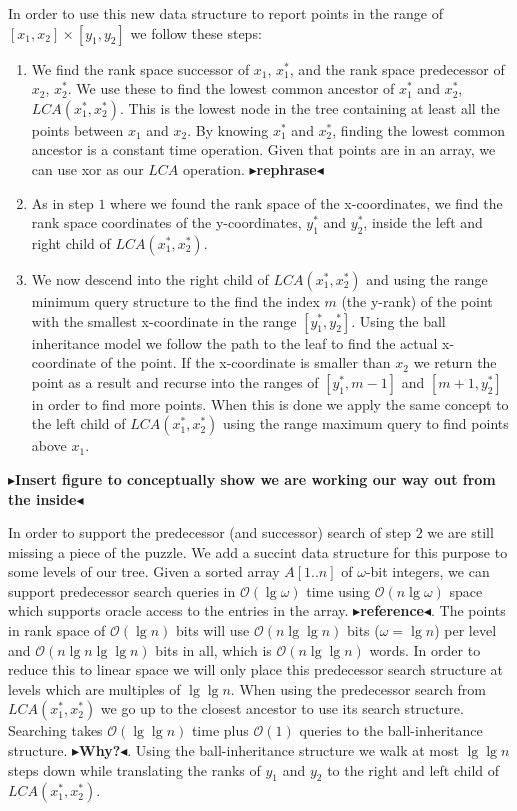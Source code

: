 \documentclass[twoside,11pt,openright]{report}
\newcommand{\todo}[1]{{\color[rgb]{.5,0,0}\textbf{$\blacktriangleright$#1$\blacktriangleleft$}}}
\begin{document}
In order to use this new data structure to report points in the range of $[x_1, x_2] \times [y_1, y_2]$ we follow these steps:
\begin{enumerate}
  \item We find the rank space successor of $x_1$, $x^*_1$, and the rank space predecessor of $x_2$, $x^*_2$. We use these to find the lowest common ancestor of $x^*_1$ and $x^*_2$, $LCA(x^*_1, x^*_2)$. This is the lowest node in the tree containing at least all the points between $x_1$ and $x_2$. By knowing $x^*_1$ and $x^*_2$, finding the lowest common ancestor is a constant time operation. Given that points are in an array, we can use xor as our $LCA$ operation. \todo{rephrase}
  \item As in step $1$ where we found the rank space of the x-coordinates, we find the rank space coordinates of the y-coordinates, $y^*_1$ and $y^*_2$, inside the left and right child of $LCA(x^*_1, x^*_2)$.
  \item We now descend into the right child of $LCA(x^*_1, x^*_2)$ and using the range minimum query structure to the find the index $m$ (the y-rank) of the point with the smallest x-coordinate in the range $[y^*_1, y^*_2]$. Using the ball inheritance model we follow the path to the leaf to find the actual x-coordinate of the point. If the x-coordinate is smaller than $x_2$ we return the point as a result and recurse into the ranges of $[y^*_1, m-1]$ and $[m+1, y^*_2]$ in order to find more points. When this is done we apply the same concept to the left child of $LCA(x^*_1, x^*_2)$ using the range maximum query to find points above $x_1$.
\end{enumerate}

\todo{Insert figure to conceptually show we are working our way out from the inside}

In order to support the predecessor (and successor) search of step $2$ we are still missing a piece of the puzzle. We add a succint data structure for this purpose to some levels of our tree. Given a sorted array $A[1..n]$ of $\omega$-bit integers, we can support predecessor search queries in $\mathcal{O}(\lg \omega)$ time using $\mathcal{O}(n \lg \omega)$ space which supports oracle access to the entries in the array. \todo{reference}. The points in rank space of $\mathcal{O}(\lg n)$ bits will use $\mathcal{O}(n \lg \lg n)$ bits ($\omega = \lg n$) per level and $\mathcal{O}(n \lg n \lg \lg n)$ bits in all, which is $\mathcal{O}(n \lg \lg n)$ words. In order to reduce this to linear space we will only place this predecessor search structure at levels which are multiples of $\lg \lg n$. When using the predecessor search from $LCA(x^*_1, x^*_2)$ we go up to the closest ancestor to use its search structure. Searching takes $\mathcal{O}(\lg \lg n)$ time plus $\mathcal{O}(1)$ queries to the ball-inheritance structure. \todo{Why?}. Using the ball-inheritance structure we walk at most $\lg \lg n$ steps down while translating the ranks of $y_1$ and $y_2$ to the right and left child of $LCA(x^*_1, x^*_2)$. 
\end{document}
